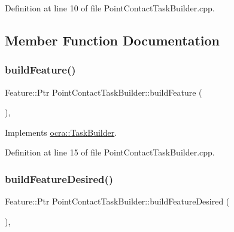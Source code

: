 Definition at line 10 of file Point\+Contact\+Task\+Builder.\+cpp.



\subsection{Member Function Documentation}
\hypertarget{classocra_1_1PointContactTaskBuilder_a220c35d105a88cd0e2407779ab1556f2}{}\label{classocra_1_1PointContactTaskBuilder_a220c35d105a88cd0e2407779ab1556f2} 
\subsubsection{\texorpdfstring{build\+Feature()}{buildFeature()}}
{\footnotesize\ttfamily Feature\+::\+Ptr Point\+Contact\+Task\+Builder\+::build\+Feature (\begin{DoxyParamCaption}{ }\end{DoxyParamCaption})\hspace{0.3cm}{\ttfamily [protected]}, {\ttfamily [virtual]}}



Implements \hyperlink{classocra_1_1TaskBuilder_a58c0dc416a9607a344a080248ee26ac2}{ocra\+::\+Task\+Builder}.



Definition at line 15 of file Point\+Contact\+Task\+Builder.\+cpp.

\hypertarget{classocra_1_1PointContactTaskBuilder_a253f8fffbd548b63badee23e2c42eb95}{}\label{classocra_1_1PointContactTaskBuilder_a253f8fffbd548b63badee23e2c42eb95} 
\subsubsection{\texorpdfstring{build\+Feature\+Desired()}{buildFeatureDesired()}}
{\footnotesize\ttfamily Feature\+::\+Ptr Point\+Contact\+Task\+Builder\+::build\+Feature\+Desired (\begin{DoxyParamCaption}{ }\end{DoxyParamCaption})\hspace{0.3cm}{\ttfamily [protected]}, {\ttfamily [virtual]}}



